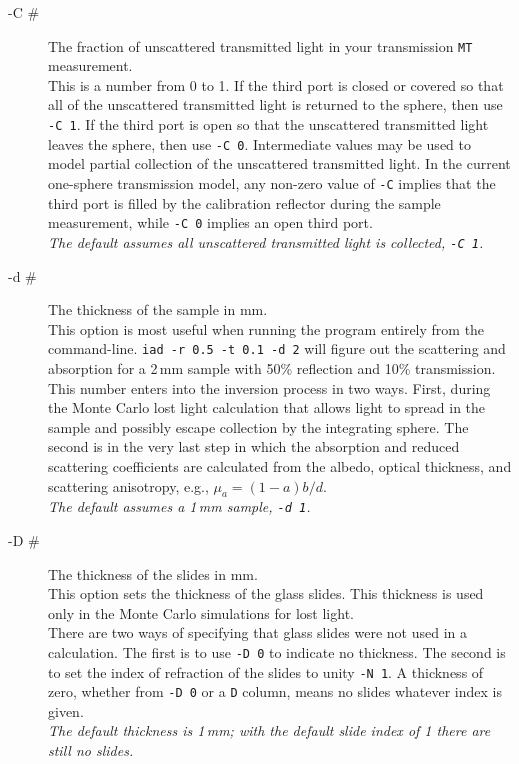 \documentclass{article}
\begin{document}
\begin{description}
    \item[-C \#] The fraction of unscattered transmitted light in your transmission \texttt{MT} measurement.\\[1mm]
                 This is a number from 0 to 1.  If the third port is closed or covered so that all of the unscattered
                 transmitted light is returned to the sphere, then use \texttt{-C 1}.  If the third port is open so that
                 the unscattered transmitted light leaves the sphere, then use \texttt{-C 0}.  Intermediate values may be
                 used to model partial collection of the unscattered transmitted light.  In the current one-sphere
                 transmission model, any non-zero value of \texttt{-C} implies that the third port is filled by the
                 calibration reflector during the sample measurement, while \texttt{-C 0} implies an open third port.\\[1mm]
                 \textit{The default assumes all unscattered transmitted light is collected, \texttt{-C 1}.}
  
    \item[-d \#] The thickness of the sample in mm.\\[1mm]
                 This option is most useful when running the program entirely from the command-line.  \texttt{iad -r 0.5 -t 0.1 -d 2}
                 will figure out the scattering and absorption for a 2\,mm sample with 50\% reflection and 10\%
                 transmission.\\[1mm]
                 This number enters into the inversion process in two ways.  First, during the Monte Carlo lost light 
                 calculation that allows light to spread in the sample and possibly escape collection by the 
                 integrating sphere.  The second is in the very last step in which the absorption and reduced 
                 scattering coefficients are calculated from the albedo, optical
                 thickness, and scattering anisotropy, e.g., $\mu_a=(1-a)b/d$.\\[1mm]
                 \textit{The default assumes a 1\,mm sample, \texttt{-d 1}.}
               
    \item[-D \#] The thickness of the slides in mm.\\[1mm]
                 This option sets the thickness of the glass slides.  This thickness is used
                 only in the Monte Carlo simulations for lost light.\\[1mm]
                 There are two ways of specifying that glass slides were not used in a calculation.  The first is
                 to use \texttt{-D 0} to indicate no thickness.  The second is to set the index
                 of refraction of the slides to unity \texttt{-N 1}.  A thickness of zero, whether from
                 \texttt{-D 0} or a \texttt{D} column, means no slides whatever index is given.\\[1mm]
                 \textit{The default thickness is 1\,mm; with the default slide index of 1 there are
                 still no slides.}


\end{description}
\end{document}
